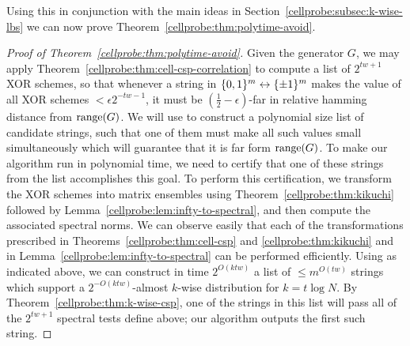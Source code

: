 Using this in conjunction with the main ideas in Section~\ref{cellprobe:subsec:k-wise-lbs} we can now prove Theorem~\ref{cellprobe:thm:polytime-avoid}.
\begin{proof}[Proof of Theorem~\ref{cellprobe:thm:polytime-avoid}]
Given the generator $G$, we may apply Theorem~\ref{cellprobe:thm:cell-csp-correlation} to compute a list of $2^{tw+1}$ XOR schemes, so that whenever a string in $\{0,1\}^m \leftrightarrow\{\pm 1\}^m$ makes the value of all XOR schemes $< \epsilon2^{-tw-1}$, it must be $(\frac{1}{2}-\epsilon)$-far in relative hamming distance from $\mathrm{range}(G)$. We will use \cite{naornaor} to construct a polynomial size list of candidate strings, such that one of them must make all such values small simultaneously which will guarantee that it is far form $\mathrm{range}(G)$. To make our algorithm run in polynomial time, we need to certify that one of these strings from the list accomplishes this goal.
To perform this certification, we transform the XOR schemes into matrix ensembles using Theorem~\ref{cellprobe:thm:kikuchi} followed by Lemma~\ref{cellprobe:lem:infty-to-spectral}, and then compute the associated spectral norms. We can observe easily that each of the transformations prescribed in Theorems~\ref{cellprobe:thm:cell-csp} and \ref{cellprobe:thm:kikuchi} and in Lemma~\ref{cellprobe:lem:infty-to-spectral} can be performed efficiently.
Using \cite{naornaor} as indicated above, we can construct in time $2^{O(ktw)}$ a list of $\leq m^{O(tw)}$ strings which support a $2^{-O(ktw)}$-almost $k$-wise distribution for $k= t\log N$. By Theorem~\ref{cellprobe:thm:k-wise-csp}, one of the strings in this list will pass all of the $2^{tw+1}$ spectral tests define above; our algorithm outputs the first such string.
\end{proof}

